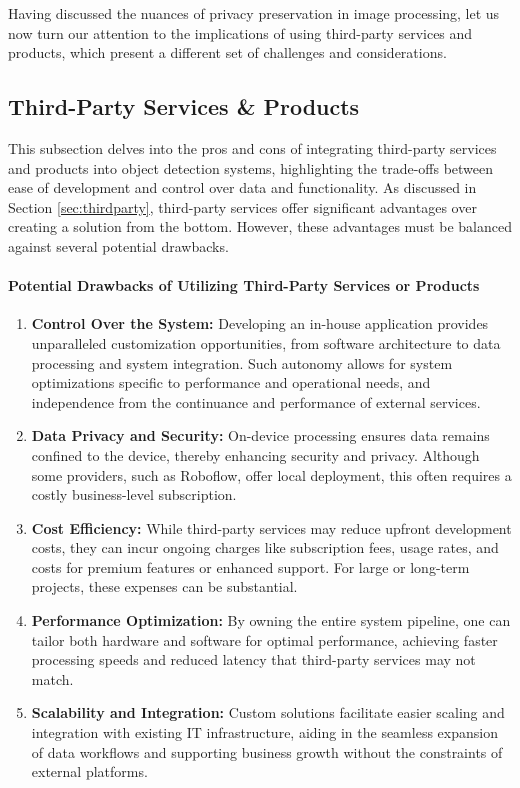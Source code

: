 Having discussed the nuances of privacy preservation in image processing, let us now turn our attention to the implications of using third-party services and products, which present a different set of challenges and considerations.

\subsection{Third-Party Services \& Products}
\label{sec:discuss_thirdparty}
This subsection delves into the pros and cons of integrating third-party services and products into object detection systems, highlighting the trade-offs between ease of development and control over data and functionality. As discussed in Section \ref{sec:thirdparty}, third-party services offer significant advantages over creating a solution from the bottom. However, these advantages must be balanced against several potential drawbacks.
\paragraph{Potential Drawbacks of Utilizing Third-Party Services or Products}
\begin{enumerate}
    \item \textbf{Control Over the System:} Developing an in-house application provides unparalleled customization opportunities, from software architecture to data processing and system integration. Such autonomy allows for system optimizations specific to performance and operational needs, and independence from the continuance and performance of external services.
    
    \item \textbf{Data Privacy and Security:} On-device processing ensures data remains confined to the device, thereby enhancing security and privacy. Although some providers, such as Roboflow, offer local deployment, this often requires a costly business-level subscription.
    
    \item \textbf{Cost Efficiency:} While third-party services may reduce upfront development costs, they can incur ongoing charges like subscription fees, usage rates, and costs for premium features or enhanced support. For large or long-term projects, these expenses can be substantial.
    
    \item \textbf{Performance Optimization:} By owning the entire system pipeline, one can tailor both hardware and software for optimal performance, achieving faster processing speeds and reduced latency that third-party services may not match.
    
    \item \textbf{Scalability and Integration:} Custom solutions facilitate easier scaling and integration with existing IT infrastructure, aiding in the seamless expansion of data workflows and supporting business growth without the constraints of external platforms.
\end{enumerate}

